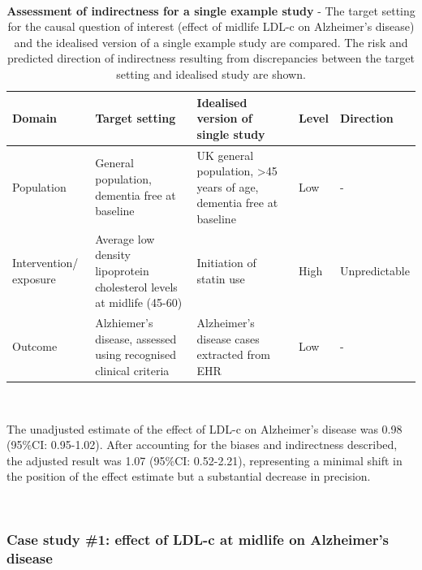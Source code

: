 \documentclass[a4paper, twoside]{templates/ociamthesis}
\begin{document}
~\\




\begin{table}[H]

\caption[Assessment of indirectness for a single example study]{\label{tab:singleIndirect-table}\textbf{Assessment of indirectness for a single example study} - The target setting for the causal question of interest (effect of midlife LDL-c on Alzheimer's disease) and the idealised version of a single example study are compared. The risk and predicted direction of indirectness resulting from discrepancies between the target setting and idealised study are shown.}
\centering
\begin{tabular}[t]{>{\raggedright\arraybackslash}p{5em}>{\centering\arraybackslash}p{8em}>{\centering\arraybackslash}p{8em}>{\centering\arraybackslash}p{3em}>{\centering\arraybackslash}p{6em}}
\toprule
\textbf{Domain} & \textbf{Target setting} & \textbf{Idealised version of single study} & \textbf{Level} & \textbf{Direction}\\
\midrule
Population & General population, dementia free at baseline & UK general population, >45 years of age, dementia free at baseline & Low & -\\
\midrule
Intervention/ exposure & Average low density lipoprotein cholesterol levels at midlife (45-60) & Initiation of statin use & High & Unpredictable\\
\midrule
Outcome & Alzhiemer's disease, assessed using recognised clinical criteria & Alzheimer's disease cases extracted from EHR & Low & -\\
\bottomrule
\end{tabular}
\end{table}

~

The unadjusted estimate of the effect of LDL-c on Alzheimer's disease was 0.98 (95\%CI: 0.95-1.02). After accounting for the biases and indirectness described, the adjusted result was 1.07 (95\%CI: 0.52-2.21), representing a minimal shift in the position of the effect estimate but a substantial decrease in precision.

~

\hypertarget{case-study-1-effect-of-ldl-c-at-midlife-on-alzheimers-disease}{%
\subsubsection{Case study \#1: effect of LDL-c at midlife on Alzheimer's disease}\label{case-study-1-effect-of-ldl-c-at-midlife-on-alzheimers-disease}}
\end{document}
